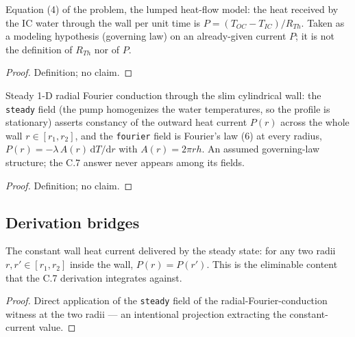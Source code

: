 \begin{definition}
\label{def:IPhO2026Problems_problem_IPhO_2026_4_C_7:LumpedHeatFlowLaw}
Equation (4) of the problem, the lumped heat-flow model: the heat received
by the IC water through the wall per unit time is
$P = (T_{OC} - T_{IC})/R_{Th}$. Taken as a modeling hypothesis (governing
law) on an already-given current $P$; it is not the definition of
$R_{Th}$ nor of $P$.
\end{definition}
\begin{proof}
Definition; no claim.
\end{proof}

\begin{definition}
\label{def:IPhO2026Problems_problem_IPhO_2026_4_C_7:RadialFourierConduction}
Steady 1-D radial Fourier conduction through the slim cylindrical wall:
the \texttt{steady} field (the pump homogenizes the water temperatures, so
the profile is stationary) asserts constancy of the outward heat current
$P(r)$ across the whole wall $r \in [r_1, r_2]$, and the
\texttt{fourier} field is Fourier's law (6) at every radius,
$P(r) = -\lambda\,A(r)\,\mathrm{d}T/\mathrm{d}r$ with
$A(r) = 2\pi r h$. An assumed governing-law structure; the C.7 answer
never appears among its fields.
\end{definition}
\begin{proof}
Definition; no claim.
\end{proof}

\subsection*{Derivation bridges}

\begin{lemma}
\label{lem:IPhO2026Problems_problem_IPhO_2026_4_C_7:RadialFourierConduction.wall_current}
The constant wall heat current delivered by the steady state: for any two
radii $r, r' \in [r_1, r_2]$ inside the wall, $P(r) = P(r')$. This is the
eliminable content that the C.7 derivation integrates against.
\end{lemma}
\begin{proof}
Direct application of the \texttt{steady} field of the
radial-Fourier-conduction witness at the two radii --- an intentional
projection extracting the constant-current value.
\end{proof}

